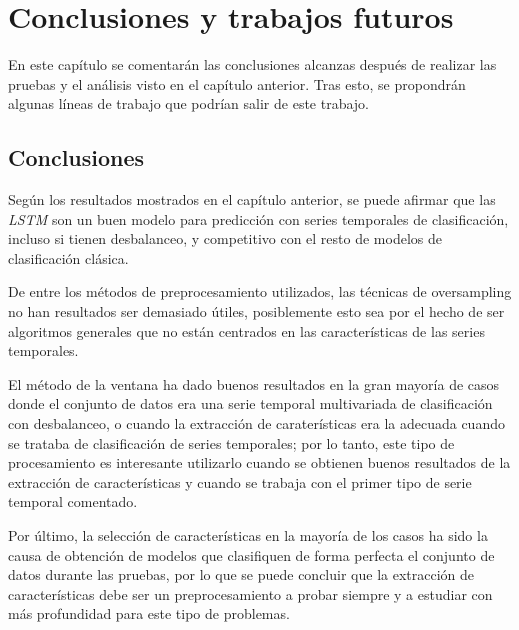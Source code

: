 \chapter{Conclusiones y trabajos futuros}
En este capítulo se comentarán las conclusiones alcanzas después de realizar las pruebas y el análisis visto en el capítulo anterior. Tras esto, se propondrán algunas líneas de trabajo que podrían salir de este trabajo.\newline

\section{Conclusiones}
Según los resultados mostrados en el capítulo anterior, se puede afirmar que las \textit{LSTM} son un buen modelo para predicción con series temporales de clasificación, incluso si tienen desbalanceo, y competitivo con el resto de modelos de clasificación clásica.\newline

De entre los métodos de preprocesamiento utilizados, las técnicas de oversampling no han resultados ser demasiado útiles, posiblemente esto sea por el hecho de ser algoritmos generales que no están centrados en las características de las series temporales.\newline

El método de la ventana ha dado buenos resultados en la gran mayoría de casos donde el conjunto de datos era una serie temporal multivariada de clasificación con desbalanceo, o cuando la extracción de caraterísticas era la adecuada cuando se trataba de clasificación de series temporales; por lo tanto, este tipo de procesamiento es interesante utilizarlo cuando se obtienen buenos resultados de la extracción de características y cuando se trabaja con el primer tipo de serie temporal comentado.\newline

Por último, la selección de características en la mayoría de los casos ha sido la causa de obtención de modelos que clasifiquen de forma perfecta el conjunto de datos durante las pruebas, por lo que se puede concluir que la extracción de características debe ser un preprocesamiento a probar siempre y a estudiar con más profundidad para este tipo de problemas.\newline

